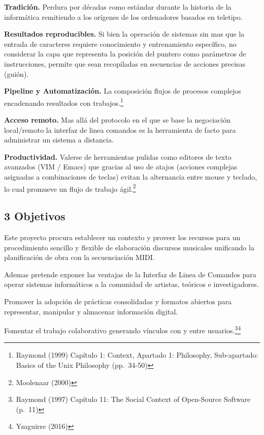 \documentclass[]{article}
\begin{document}
\textbf{Tradición.} Perdura por décadas como estándar durante la
historia de la informática remitiendo a los orígenes de los ordenadores
basados en teletipo.

\textbf{Resultados reproducibles.} Si bien la operación de sistemas sin
mas que la entrada de caracteres requiere conocimiento y entrenamiento
específico, no considerar la capa que representa la posición del puntero
como parámetros de instrucciones, permite que sean recopiladas en
secuencias de acciones precisas (guión).

\textbf{Pipeline y Automatización.} La composición flujos de procesos
complejos encadenando resultados con trabajos.\footnote{Raymond (1999)
  Capítulo 1: Context, Apartado 1: Philosophy, Sub-apartado: Basics of
  the Unix Philosophy (pp.~34-50)}

\textbf{Acceso remoto.} Mas allá del protocolo en el que se base la
negociación local/remoto la interfaz de linea comandos es la herramienta
de facto para administrar un sistema a distancia.

\textbf{Productividad.} Valerse de herramientas pulidas como editores de
texto avanzados (VIM / Emacs) que gracias al uso de atajos (acciones
complejas asignadas a combinaciones de teclas) evitan la alternancia
entre mouse y teclado, lo cual promueve un flujo de trabajo
ágil.\footnote{Moolenaar (2000)}

\hypertarget{objetivos}{%
\subsection{3 Objetivos}\label{objetivos}}

Este proyecto procura establecer un contexto y proveer los recursos para
un procedimiento sencillo y flexible de elaboración discursos musicales
unificando la planificación de obra con la secuenciación MIDI.

Ademas pretende exponer las ventajas de la Interfaz de Linea de Comandos
para operar sistemas informáticos a la comunidad de artistas, teóricos e
investigadores.

Promover la adopción de prácticas consolidadas y formatos abiertos para
representar, manipular y almacenar información digital.

Fomentar el trabajo colaborativo generando vínculos con y entre
usuarios.\footnote{Raymond (1997) Capítulo 11: The Social Context of
  Open-Source Software (p.~11)}\footnote{Yzaguirre (2016)}

\newpage
\end{document}
